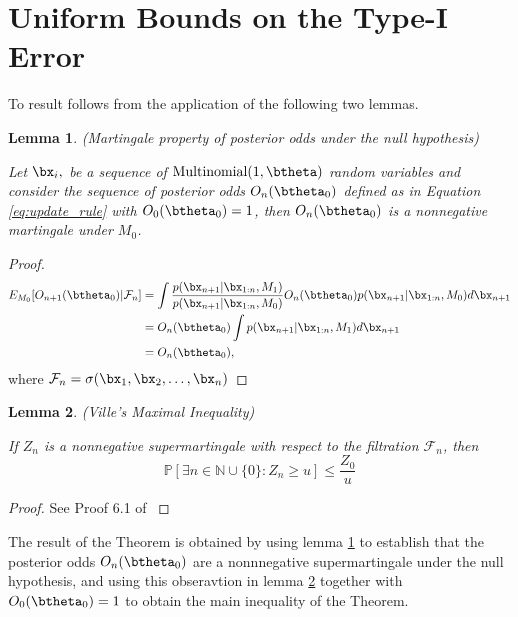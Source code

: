 \documentclass[11pt]{article}
\newtheorem{lemma}{Lemma}[section]
\begin{document}
\section{Uniform Bounds on the Type-I Error}
\label{app:type_1_error}
To result follows from the application of the following two lemmas.
\begin{lemma}(Martingale property of posterior odds under the null hypothesis)
  
  \noindent Let $\bx_i,$ be a sequence of $\text{Multinomial}(1,\btheta)$ random variables and consider the sequence of posterior odds $O_n(\btheta_0)$ defined as in Equation \eqref{eq:update_rule} with $O_0(\btheta_0)=1$, then $O_n(\btheta_0)$ is a nonnegative martingale under $M_0$.
  \label{lem:posterior_odds_martingale}
    \end{lemma}
  \begin{proof}
  \begin{align*}
    E_{M_0}[O_{n+1}(\btheta_0)|\mathcal{F}_n]  &= \int \frac{p(\bx_{n+1}|\bx_{1:n},M_1)}{p(\bx_{n+1}|\bx_{1:n},M_0)} O_{n}(\btheta_0) p(\bx_{n+1}|\bx_{1:n},M_0) d\bx_{n+1}\\
    &=  O_{n}(\btheta_0) \int p(\bx_{n+1}|\bx_{1:n},M_1) d\bx_{n+1}\\
    &=  O_{n}(\btheta_0),
  \end{align*}
  where $\mathcal{F}_{n} = \sigma(\bx_1,\bx_2,\dots, \bx_n)$
\end{proof}

\begin{lemma}(Ville's Maximal Inequality)
  
\label{lem:durrett}
  \noindent If $Z_{n}$ is a nonnegative supermartingale with respect to the filtration $\mathcal{F}_n$, then
  \begin{equation}
    \label{eq:durrett}
    \mathbb{P}[\exists n \in \mathbb{N}\cup \lbrace 0 \rbrace : Z_n \geq u] \leq \frac{Z_0}{u}
  \end{equation}
\end{lemma}
\begin{proof}
  See Proof 6.1 of \cite{howard}
\end{proof}
The result of the Theorem is obtained by using lemma \ref{lem:posterior_odds_martingale} to establish that the posterior odds $O_n(\btheta_0)$ are a nonnnegative supermartingale under the null hypothesis, and using this obseravtion in lemma \ref{lem:durrett} together with  $O_0(\btheta_0) = 1$  to obtain the main inequality of the Theorem.
\end{document}
